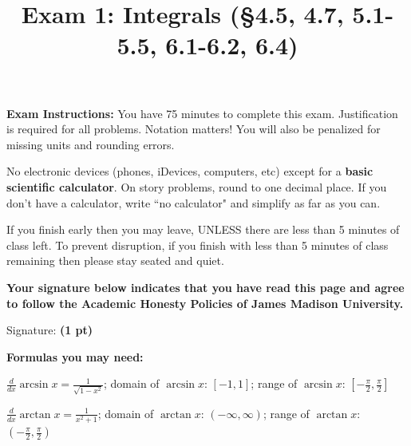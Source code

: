 \documentclass[12pt, addpoints]{exam/exam}
\title{\vspace{-8pc}
\vfill{\Huge
	\bf Exam 1: Integrals (\S4.5, 4.7, 5.1-5.5, 6.1-6.2, 6.4)} 
	}
\date{}
\newcommand{\1}{^{-1}}
\theoremstyle{plain}
\begin{document}
\begin{coverpages}
\maketitle
\thispagestyle{headandfoot}
\vspace{-4pc}
{\bf Exam Instructions:} You have 75 minutes to complete this exam.  Justification is required for all problems.  Notation matters!  You will also be penalized for missing units and rounding errors.  

\vspace{1pc}
No electronic devices (phones, iDevices, computers, etc) except for a \textbf{basic scientific calculator}.  On story problems, round to one decimal place. If you don't have a calculator, write ``no calculator" and simplify as far as you can.

\vspace{1pc}
If you finish early then you may leave, UNLESS there are less than 5 minutes of class left.  To prevent disruption, if you finish with less than 5 minutes of class remaining then please stay seated and quiet.

\begin{flushright}

\vspace{0.3in}

\vspace{0.3in}
\end{flushright}

\vfill
\textbf{Your signature below indicates that you have read this page and agree to follow the Academic Honesty Policies of James Madison University.}  

\vspace{0.3in}
Signature: {\bf (1 pt)} \underline{\hspace{73ex}}

\newpage
\textbf{Formulas you may need:}

\vspace{1pc}
$\frac{d}{dx}\arcsin x=\frac{1}{\sqrt{1-x^2}}$; domain of $\arcsin x$: $[-1,1]$; range of $\arcsin x$: $[-\frac{\pi}{2},\frac{\pi}{2}]$

$\frac{d}{dx}\arctan x=\frac{1}{x^2+1}$; domain of $\arctan x$: $(-\infty, \infty)$; range of $\arctan x$: $(-\frac{\pi}{2},\frac{\pi}{2})$


\end{coverpages}
\end{document}
